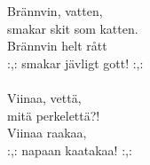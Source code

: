 
            Brännvin, vatten, \\
            smakar skit som katten. \\
            Brännvin helt rått \\
            :,: smakar jävligt gott! :,: \\
\hspace{10mm} \\
            Viinaa, vettä, \\
            mitä perkelettä?! \\
            Viinaa raakaa, \\
            :,: napaan kaatakaa! :,: \\
